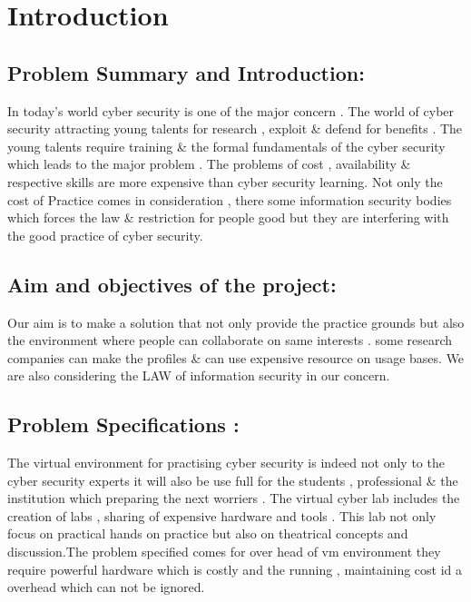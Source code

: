 \documentclass[12pt,a4paper,final,oneside]{report}
\begin{document}
\newpage
	\pagestyle{plain}
	\tableofcontents 
	\listoffigures
	
	\chapter{Introduction}
	\noindent\textbf{}
	
	\section{ Problem Summary and Introduction:}
	
\noindent\textbf{} 
\par In today's world cyber security is one of the major concern . The world of cyber security  attracting young talents for research , exploit \& defend for benefits . The young talents require training \& the formal fundamentals of the cyber security which leads to the major problem . The problems of cost , availability \& respective skills are more expensive than cyber security learning. Not only the cost of Practice comes in consideration , there some information security bodies which forces the law \& restriction for people good but they are interfering with the good practice of cyber security.
	\raggedright
	\section{ Aim and objectives of the project:}
	Our aim is to make a solution that not only provide the practice grounds but also the environment where people can collaborate on same interests . some research companies can make the profiles \& can use expensive resource on usage bases. We are also considering the LAW of information security in our concern.
	
	\noindent\textbf{}
	\noindent\textbf{}
	\newpage
	\section{ Problem Specifications :}
\noindent\par The virtual environment for practising cyber security is indeed not only to the cyber security experts it will also be use full for the students , professional \& the institution which preparing the next worriers . The virtual cyber lab includes the creation of labs , sharing of  expensive hardware and tools . This lab not only focus on practical hands on practice but also on theatrical concepts and discussion.The problem specified comes for over head of vm environment they require powerful hardware which is costly and the running , maintaining cost id a overhead which can not be ignored.
\end{document}
